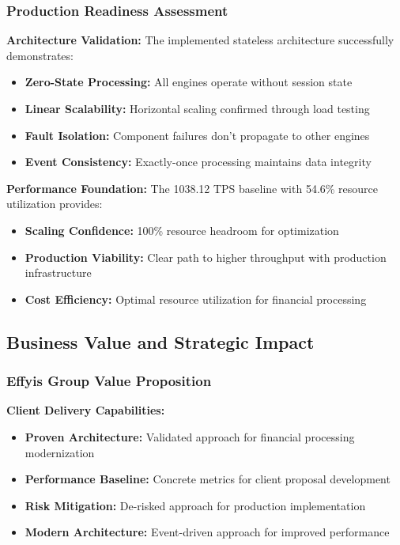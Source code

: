 \subsubsection{Production Readiness Assessment}

\textbf{Architecture Validation:}
The implemented stateless architecture successfully demonstrates:
\begin{itemize}
    \item \textbf{Zero-State Processing:} All engines operate without session state
    \item \textbf{Linear Scalability:} Horizontal scaling confirmed through load testing
    \item \textbf{Fault Isolation:} Component failures don't propagate to other engines
    \item \textbf{Event Consistency:} Exactly-once processing maintains data integrity
\end{itemize}

\textbf{Performance Foundation:}
The 1038.12 TPS baseline with 54.6\% resource utilization provides:
\begin{itemize}
    \item \textbf{Scaling Confidence:} 100\% resource headroom for optimization
    \item \textbf{Production Viability:} Clear path to higher throughput with production infrastructure
    \item \textbf{Cost Efficiency:} Optimal resource utilization for financial processing
\end{itemize}

\subsection{Business Value and Strategic Impact}

\subsubsection{Effyis Group Value Proposition}

\textbf{Client Delivery Capabilities:}
\begin{itemize}
    \item \textbf{Proven Architecture:} Validated approach for financial processing modernization
    \item \textbf{Performance Baseline:} Concrete metrics for client proposal development
    \item \textbf{Risk Mitigation:} De-risked approach for production implementation
    \item \textbf{Modern Architecture:} Event-driven approach for improved performance
\end{itemize}

